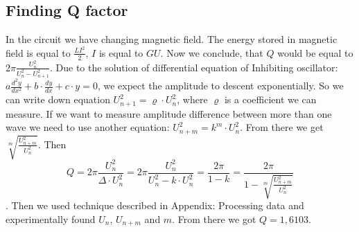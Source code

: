 \documentclass[10pt,a4paper]{article}
\begin{document}
\subsection{Finding Q factor}
In the circuit we have changing magnetic field. The energy stored in magnetic field is equal to $\frac{LI^{2}}{2}$, $I$ is equal to $GU$. Now we conclude, that $Q$ would be equal to $2\pi \frac{U_{n}^{2}}{U_{n}^{2} - U_{n + 1}^{2}}$. Due to the solution of differential equation of Inhibiting oscillator: $ a \frac{d^{2}y}{dx^{2}} + b \cdot \frac{dy}{dx} + c\cdot y = 0$, we expect the amplitude to descent exponentially. So we can write down equation $ U_{n+1}^{2} = \varrho \cdot U_n^{2}$, where $\varrho$ is a coefficient we can measure. If we want to measure amplitude difference between more than one wave we need to use another equation: $U_{n+m}^{2} = k ^{m} \cdot U_n^{2}$. From there we get $\sqrt[m]{\frac{U_{n+m}^{2}}{U_{n}^{2}}}$. Then $$ Q = 2\pi \frac{U_{n}^{2}}{\Delta \cdot U_{n}^{2}}  = 2\pi \frac{U_{n}^{2}}{U_{n}^{2} - k \cdot U_{n}^{2}} = \frac{2\pi}{1 - k} = \frac{2\pi}{1 - \sqrt[m]{\frac{U_{n + m}^{2}}{U_{n}^{2}}}}$$. Then we used technique described in Appendix: Processing data and experimentally found $U_{n}$, $U_{n+m}$ and $m$. From there we got $Q = 1,6103$.
\end{document}
